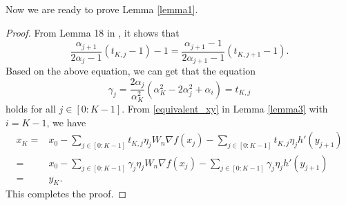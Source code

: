 \documentclass{article}
\begin{document}
Now we are ready to prove Lemma \ref{lemma1}.
\begin{proof}
From Lemma 18 in \cite{JangGR23}, it shows that 
\[
\frac{\alpha_{j+1}}{2\alpha_{j}-1}(t_{K,j}-1) -1 = \frac{\alpha_{j+1}-1}{2\alpha_{j+1}-1}(t_{K,j+1}-1).
\]
Based on the above equation, we can get that  the equation 
\[
\gamma_{j}=\frac{2\alpha_{j}}{\alpha_{K}^{2}}(\alpha_{K}^{2}-2\alpha_{j}^{2}+\alpha_{i}) =t_{K,j}
\]
holds for all $j\in[0:K-1]$. From \eqref{equivalent_xy} in Lemma \ref{lemma3} with $i=K-1$, we have 
\begin{align*}
x_{K}=&x_0-\sum_{j\in[0:K-1]}t_{K,j}\eta_{j}W_{n}\nabla f(x_j)- \sum_{j\in[0:K-1]}t_{K,j}\eta_{j}h'(y_{j+1})\\
=&x_0-\sum_{j\in[0:K-1]}\gamma_{j}\eta_{j}W_{n}\nabla f(x_j)- \sum_{j\in[0:K-1]}\gamma_{j}\eta_{j}h'(y_{j+1})\\
=&y_{K}.
\end{align*}
This completes the proof.
\end{proof}


%

\end{document}
